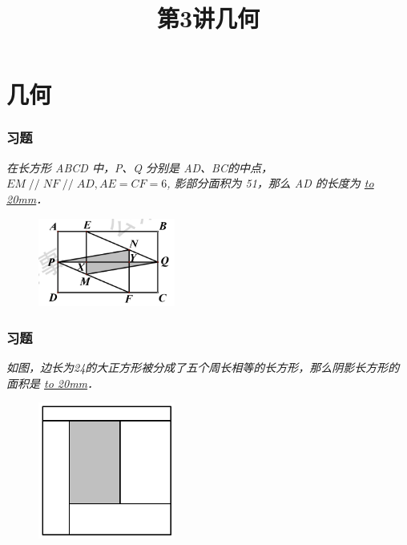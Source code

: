 \section{几何}

\title[第3讲\quad 几何]{第3讲\quad 几何} 
\author{}
\date{}

\begin{frame}
    \titlepage
\end{frame}

\setcounter{framecounter}{0}

\begin{frame}
    \frametitle{习题\theframecounter}
    \vspace*{-1cm}
    \textit{在长方形 ABCD 中，P、Q 分别是 AD、BC的中点， $EM\mathop{//} NF\mathop{//} AD, AE=CF=6$, 影部分面积为 51，那么 AD 的长度为 \underline{\hbox to 20mm{}}．} 
    \begin{figure}[H] 
        \centering
        \includegraphics[width=0.4\textwidth]{./pics/Chapter_3/1.png}
    \end{figure}
\end{frame}

\begin{frame}
    \frametitle{习题\theframecounter}
    \textit{如图，边长为24的大正方形被分成了五个周长相等的长方形，那么阴影长方形的面积是 \underline{\hbox to 20mm{}}．} 
    \begin{figure}[H] 
        \centering
        \includegraphics[width=0.4\textwidth]{./pics/Chapter_3/2.png}
    \end{figure}
\end{frame}


